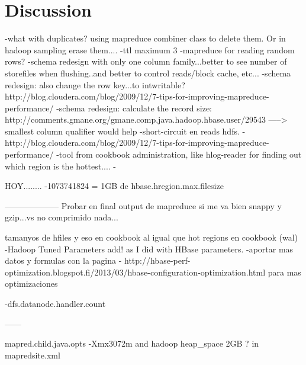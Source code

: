 \chapter{Discussion}
\label{chapter:discussion}

-what with duplicates? using mapreduce combiner class to delete them. Or in hadoop sampling erase them....
-ttl maximum 3
-mapreduce for reading random rows?
-schema redesign with only one column family...better to see number of storefiles when flushing..and better to control reads/block cache, etc...
-schema redesign: also change the row key...to intwritable? http://blog.cloudera.com/blog/2009/12/7-tips-for-improving-mapreduce-performance/
-schema redesign: calculate the record size: http://comments.gmane.org/gmane.comp.java.hadoop.hbase.user/29543  -----> smallest column qualifier would help
-short-circuit en reads hdfs.
-http://blog.cloudera.com/blog/2009/12/7-tips-for-improving-mapreduce-performance/
-tool from cookbook administration, like hlog-reader for finding out which region is the hottest....
-





HOY........
-1073741824 = 1GB de hbase.hregion.max.filesize






--------------------
Probar en final output de mapreduce si me va bien snappy y gzip...vs no comprimido nada...

tamanyos de hfiles y eso en cookbook
al igual que hot regions en cookbook (wal) 
-Hadoop Tuned Parameters add! as I did with HBase parameters.
-aportar mas datos y formulas con la pagina 
- http://hbase-perf-optimization.blogspot.fi/2013/03/hbase-configuration-optimization.html para mas optimizaciones


-dfs.datanode.handler.count






------

mapred.child.java.opts -Xmx3072m and hadoop heap\_space 2GB ? in mapredsite.xml